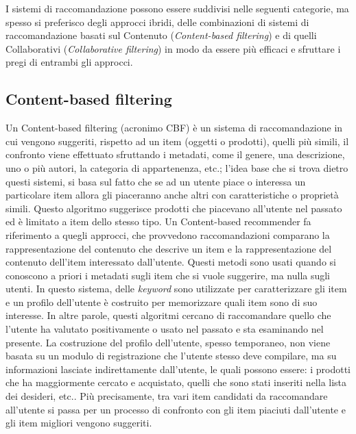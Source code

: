 I sistemi di raccomandazione possono essere suddivisi nelle seguenti categorie, ma spesso si preferisco degli approcci ibridi, delle 
combinazioni di sistemi di raccomandazione basati sul Contenuto (\textit{Content-based filtering}) e di 
quelli Collaborativi (\textit{Collaborative filtering}) in modo da essere più efficaci e sfruttare i pregi di entrambi gli approcci.
%
\subsection{Content-based filtering}
Un Content-based filtering (acronimo CBF) è un sistema di raccomandazione in cui vengono suggeriti, rispetto ad un item (oggetti o prodotti), quelli 
più simili, il confronto viene effettuato sfruttando i metadati, come il genere, una descrizione, uno o più autori, la categoria di 
appartenenza, etc.; l'idea base che si trova dietro questi sistemi, si basa sul fatto che se ad un utente piace o interessa un particolare 
item allora gli piaceranno anche altri con caratteristiche o proprietà simili.\hfill\break
Questo algoritmo suggerisce prodotti che piacevano all'utente nel passato ed è limitato a item dello stesso tipo. Un 
Content-based recommender fa riferimento a quegli approcci, che provvedono raccomandazioni comparano la rappresentazione del 
contenuto che descrive un item e la rappresentazione del contenuto dell'item interessato dall'utente.\hfill\break
Questi metodi sono usati quando si conoscono a priori i metadati sugli item che si vuole suggerire, ma nulla sugli utenti.
In questo sistema, delle \textit{keyword} sono utilizzate per caratterizzare gli item e un profilo dell'utente è 
costruito per memorizzare quali item sono di suo interesse. In altre parole, questi algoritmi cercano di raccomandare quello che 
l'utente ha valutato positivamente o usato nel passato e sta esaminando nel presente. La costruzione del profilo dell'utente, 
spesso temporaneo, non viene basata su un modulo di registrazione che l'utente stesso deve compilare, ma su informazioni 
lasciate indirettamente dall'utente, le quali possono essere: i prodotti che ha maggiormente cercato e acquistato, quelli che sono 
stati inseriti nella lista dei desideri, etc.. Più precisamente, tra vari item candidati da raccomandare all'utente si passa per un 
processo di confronto con gli item piaciuti dall'utente e gli item migliori vengono suggeriti.
%
